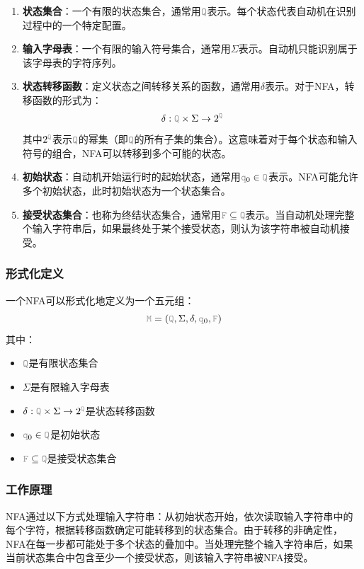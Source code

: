 \documentclass[12pt,a4paper,UTF8]{ctexart}
\newcommand{\var}[1]{\textcolor{lightgray}{\mathtt{#1}}}
\begin{document}
\begin{enumerate}
    \item \textbf{状态集合}：一个有限的状态集合，通常用$\var{Q}$表示。每个状态代表自动机在识别过程中的一个特定配置。
    
    \item \textbf{输入字母表}：一个有限的输入符号集合，通常用$\Sigma$表示。自动机只能识别属于该字母表的字符序列。
    
    \item \textbf{状态转移函数}：定义状态之间转移关系的函数，通常用$\delta$表示。对于NFA，转移函数的形式为：
    \[\delta: \var{Q} \times \Sigma \rightarrow 2^{\var{Q}}\]
    其中$2^{\var{Q}}$表示$\var{Q}$的幂集（即$\var{Q}$的所有子集的集合）。这意味着对于每个状态和输入符号的组合，NFA可以转移到多个可能的状态。
    
    \item \textbf{初始状态}：自动机开始运行时的起始状态，通常用$\var{q}_0 \in \var{Q}$表示。NFA可能允许多个初始状态，此时初始状态为一个状态集合。
    
    \item \textbf{接受状态集合}：也称为终结状态集合，通常用$\var{F} \subseteq \var{Q}$表示。当自动机处理完整个输入字符串后，如果最终处于某个接受状态，则认为该字符串被自动机接受。
\end{enumerate}

\subsubsection{形式化定义}

\qquad 一个NFA可以形式化地定义为一个五元组：
\[\var{M} = (\var{Q}, \Sigma, \delta, \var{q}_0, \var{F})\]
其中：
\begin{itemize}
    \item $\var{Q}$是有限状态集合
    \item $\Sigma$是有限输入字母表
    \item $\delta: \var{Q} \times \Sigma \rightarrow 2^{\var{Q}}$是状态转移函数
    \item $\var{q}_0 \in \var{Q}$是初始状态
    \item $\var{F} \subseteq \var{Q}$是接受状态集合
\end{itemize}

\subsubsection{工作原理}

\qquad NFA通过以下方式处理输入字符串：从初始状态开始，依次读取输入字符串中的每个字符，根据转移函数确定可能转移到的状态集合。由于转移的非确定性，NFA在每一步都可能处于多个状态的叠加中。当处理完整个输入字符串后，如果当前状态集合中包含至少一个接受状态，则该输入字符串被NFA接受。
\end{document}
